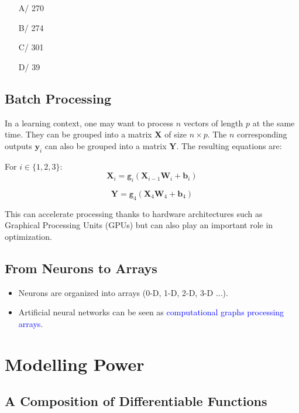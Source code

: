 \documentclass{book}
\newcommand{\y}{\mathbf{y}}
\newcommand{\X}{\mathbf{X}}
\newcommand{\Y}{\mathbf{Y}}
\newcommand{\W}{\mathbf{W}} %
\newcommand{\bias}{\mathbf{b}}%
\newcommand{\act}{\texttt{g}}%
\begin{document}
\begin{itemize}
\item[A/] 270
\item[B/] 274
\item[C/] 301
\item[D/] 39
\end{itemize}

\subsection{Batch Processing}

In a learning context, one may want to process $n$ vectors of length $p$ at the same time. They can be grouped into a matrix $\mathbf{X}$ of size $n \times p$. The $n$ corresponding outputs $\y_i$ can also be grouped into a matrix $\Y$. The resulting equations are:

\begin{myblock}{}
For $i \in \{1, 2, 3\}$:
\[
\X_i = \act_i(\X_{i-1}\W_i + \bias_i)
\]
\end{myblock}

\begin{myblock}{}
\[
\Y = \act_4(\X_4\W_4 + \bias_4)
\]
\end{myblock}

This can accelerate processing thanks to hardware architectures such as Graphical Processing Units (GPUs) but can also play an important role in optimization.

\subsection{From Neurons to Arrays}

\begin{itemize}
\item Neurons are organized into arrays (0-D, 1-D, 2-D, 3-D ...).
\item Artificial neural networks can be seen as \textcolor{blue}{computational graphs processing arrays}.
\end{itemize}

\section{Modelling Power}

\subsection{A Composition of Differentiable Functions}
\end{document}
